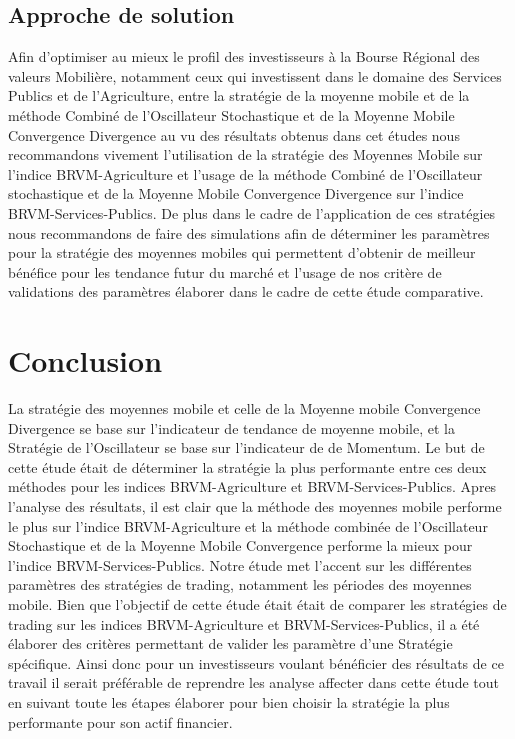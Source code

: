 \begin{itemize}
  \subsection{Approche de solution}\label{approche-de-solution}

  { Afin d'optimiser au mieux le profil des investisseurs à la Bourse
  Régional des valeurs Mobilière, notamment ceux qui investissent dans
  le domaine des Services Publics et de l'Agriculture, entre la
  stratégie de la moyenne mobile et de la méthode Combiné de
  l'Oscillateur Stochastique et de la Moyenne Mobile Convergence
  Divergence au vu des résultats obtenus dans cet études nous
  recommandons vivement l'utilisation de la stratégie des Moyennes
  Mobile sur l'indice BRVM-Agriculture et l'usage de la méthode Combiné
  de l'Oscillateur stochastique et de la Moyenne Mobile Convergence
  Divergence sur l'indice BRVM-Services-Publics. De plus dans le cadre
  de l'application de ces stratégies nous recommandons de faire des
  simulations afin de déterminer les paramètres pour la stratégie des
  moyennes mobiles qui permettent d'obtenir de meilleur bénéfice pour
  les tendance futur du marché et l'usage de nos critère de validations
  des paramètres élaborer dans le cadre de cette étude comparative. }
\end{itemize}

\section*{Conclusion}\label{conclusion}

{La stratégie des moyennes mobile et celle de la Moyenne mobile
Convergence Divergence se base sur l'indicateur de tendance de moyenne
mobile, et la Stratégie de l'Oscillateur se base sur l'indicateur de de
Momentum. Le but de cette étude était de déterminer la stratégie la plus
performante entre ces deux méthodes pour les indices BRVM-Agriculture et
BRVM-Services-Publics. Apres l'analyse des résultats, il est clair que
la méthode des moyennes mobile performe le plus sur l'indice
BRVM-Agriculture et la méthode combinée de l'Oscillateur Stochastique et
de la Moyenne Mobile Convergence performe la mieux pour l'indice
BRVM-Services-Publics. Notre étude met l'accent sur les différentes
paramètres des stratégies de trading, notamment les périodes des
moyennes mobile. Bien que l'objectif de cette étude était était de
comparer les stratégies de trading sur les indices BRVM-Agriculture et
BRVM-Services-Publics, il a été élaborer des critères permettant de
valider les paramètre d'une Stratégie spécifique. Ainsi donc pour un
investisseurs voulant bénéficier des résultats de ce travail il serait
préférable de reprendre les analyse affecter dans cette étude tout en
suivant toute les étapes élaborer pour bien choisir la stratégie la plus
performante pour son actif financier. }

